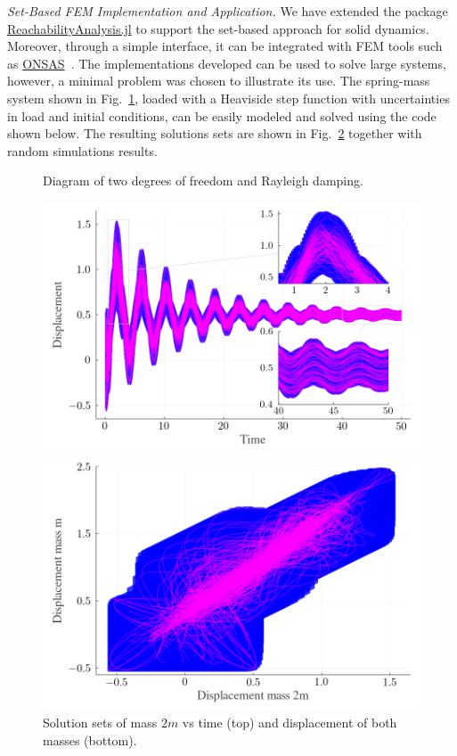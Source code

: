 \documentclass{juliacon}
\begin{document}
\emph{Set-Based FEM Implementation and Application.} %
%
We have extended the package \href{http://github.com/JuliaReach/ReachabilityAnalysis.jl}{ReachabilityAnalysis.jl}\cite{ReachabilityAnalysis} to support the set-based approach for solid dynamics. %
%
Moreover, through a simple interface, it can be integrated with FEM tools such as \href{http://www.onsas.org}{ONSAS}~\cite{onsas}.
%
The implementations developed can be used to solve large systems, however, a minimal problem was chosen to illustrate its use. %
%
The spring-mass system shown in Fig.~\ref{fig:diagram}, loaded with a Heaviside step function with uncertainties in load and initial conditions, can be easily modeled and solved using the code shown below. %
%
The resulting solutions sets are shown in Fig.~\ref{fig:example} together with random simulations results.

\begin{figure}[htb]
	\centering
	\def\svgwidth{0.26\textwidth}
	
	\caption{Diagram of two degrees of freedom and Rayleigh damping.}
	\label{fig:diagram}
\end{figure}



\begin{figure}[tb]
	\centering
	\includegraphics[width=0.82\linewidth,keepaspectratio]{example/displacement_vs_time}
	
	\includegraphics[width=0.82\linewidth,keepaspectratio]{example/displacement_vs_displacement}
	\caption{Solution sets of mass $2m$ vs time (top) and displacement of both masses (bottom).}
	\label{fig:example}
\end{figure}
\end{document}
